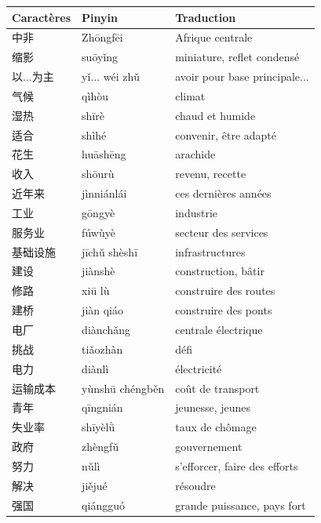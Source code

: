 \documentclass[11pt]{article}
\begin{document}
\begin{center}
\begin{tabularx}{\linewidth}{|X|X|X|}
\hline
\rowcolor{popblueL} \textbf{Caractères} & \textbf{Pinyin} & \textbf{Traduction} \\ \hline
中非 & Zhōngfēi & Afrique centrale \\ \hline
缩影 & suōyǐng & miniature, reflet condensé \\ \hline
以...为主 & yǐ... wéi zhǔ & avoir pour base principale... \\ \hline
气候 & qìhòu & climat \\ \hline
湿热 & shīrè & chaud et humide \\ \hline
适合 & shìhé & convenir, être adapté \\ \hline
花生 & huāshēng & arachide \\ \hline
收入 & shōurù & revenu, recette \\ \hline
近年来 & jìnniánlái & ces dernières années \\ \hline
工业 & gōngyè & industrie \\ \hline
服务业 & fúwùyè & secteur des services \\ \hline
基础设施 & jīchǔ shèshī & infrastructures \\ \hline
建设 & jiànshè & construction, bâtir \\ \hline
修路 & xiū lù & construire des routes \\ \hline
建桥 & jiàn qiáo & construire des ponts \\ \hline
电厂 & diànchǎng & centrale électrique \\ \hline
挑战 & tiǎozhàn & défi \\ \hline
电力 & diànlì & électricité \\ \hline
运输成本 & yùnshū chéngběn & coût de transport \\ \hline
青年 & qīngnián & jeunesse, jeunes \\ \hline
失业率 & shīyèlǜ & taux de chômage \\ \hline
政府 & zhèngfǔ & gouvernement \\ \hline
努力 & nǔlì & s'efforcer, faire des efforts \\ \hline
解决 & jiějué & résoudre \\ \hline
强国 & qiángguó & grande puissance, pays fort \\ \hline
\end{tabularx}
\end{center}
\end{document}
